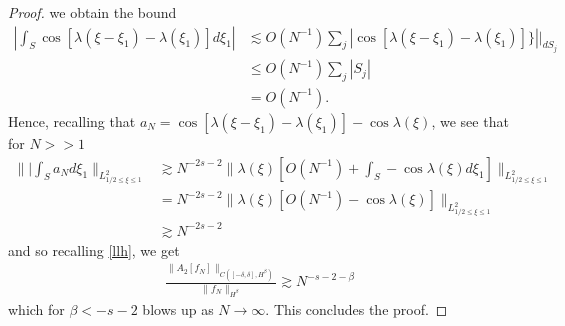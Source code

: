 \documentclass[12pt,reqno]{amsart}
\numberwithin{equation}{section}  %
\begin{document}
\begin{proof}
%
%
we obtain the bound
%
%
\begin{equation*}
\begin{split}
  | \int_{S} \cos[\lambda(\xi - \xi_{1}) - \lambda(\xi_{1})] d \xi_{1} |
   & \lesssim O(N^{-1}) \sum_{j} \left | \cos[\lambda(\xi - \xi_{1}) - \lambda(\xi_{1}) ] \} \right | \bigg |_{dS_{j}}
  \\
  & \le O(N^{-1}) \sum_{j} | S_{j} |
  \\
  & = O(N^{-1}).
\end{split}
\end{equation*}
%
%
Hence, recalling that $a_{N} =   \cos[\lambda(\xi - \xi_{1}) - \lambda(\xi_{1})] - \cos \lambda(\xi)$, we see that for $N >>1$
%
%
\begin{equation*}
\begin{split}
\| | \int_{S}a_{N} d \xi_{1} \|_{L^{2}_{1/2 \le \xi \le 1}}
& \gtrsim N^{-2s -2}\| \lambda(\xi) \left [ O(N^{-1}) +  \int_{S} -\cos \lambda(\xi) d \xi_{1} \right ] \|_{L^{2}_{1/2 \le \xi \le 1}}
\\
& = N^{-2s-2} \| \lambda(\xi)\left [ O(N^{-1}) - \cos \lambda(\xi) \right ] \|_{L^{2}_{1/2 \le \xi \le 1}}
\\
& \gtrsim N^{-2s-2}
\end{split}
\end{equation*}
%
and so recalling \eqref{llh}, we get
%
%
\begin{equation*}
\begin{split}
\frac{\|A_{2}[f_{N}]\|_{C([-\delta, \delta], H^{\beta})}}{\| f_{N}
\|_{H^{\beta}}} \gtrsim N^{-s -2 - \beta} 
\end{split}
\end{equation*}
%
%
which for $\beta < -s-2$ blows up as $N \to \infty$. This concludes the proof.
%
%
\end{proof}
%
%
%
%
%
%
%
%
%
%
%
%
%
%
%
\end{document}
